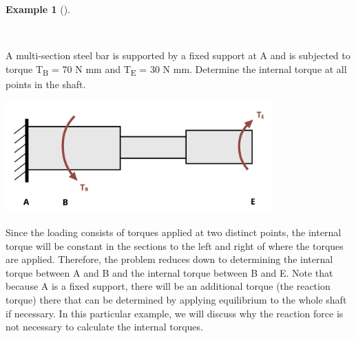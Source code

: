 \documentclass[
  letterpaper,
  DIV=11,
  numbers=noendperiod]{scrreprt}
\theoremstyle{definition}
\newtheorem{example}{Example}[chapter]
\theoremstyle{remark}
\begin{document}
\begin{tcolorbox}[enhanced jigsaw, leftrule=.75mm, bottomrule=.15mm, opacityback=0, opacitybacktitle=0.6, colframe=quarto-callout-tip-color-frame, toprule=.15mm, colbacktitle=quarto-callout-tip-color!10!white, coltitle=black, bottomtitle=1mm, title={Example 6.1}, titlerule=0mm, toptitle=1mm, colback=white, rightrule=.15mm, left=2mm, arc=.35mm, breakable]

\begin{example}[]\protect\hypertarget{exm-6.1}{}\label{exm-6.1}

~

A multi-section steel bar is supported by a fixed support at A and is
subjected to torque T\textsubscript{B} = 70 N mm and T\textsubscript{E}
= 30 N mm. Determine the internal torque at all points in the shaft.

\begin{center}
\includegraphics[width=4.04167in,height=\textheight]{images/CH6 PNGs/example 6.1 part 1.png}
\end{center}

\begin{tcolorbox}[enhanced jigsaw, leftrule=.75mm, bottomrule=.15mm, opacityback=0, opacitybacktitle=0.6, colframe=quarto-callout-tip-color-frame, toprule=.15mm, colbacktitle=quarto-callout-tip-color!10!white, coltitle=black, bottomtitle=1mm, title={Solution}, titlerule=0mm, toptitle=1mm, colback=white, rightrule=.15mm, left=2mm, arc=.35mm, breakable]

Since the loading consists of torques applied at two distinct points,
the internal torque will be constant in the sections to the left and
right of where the torques are applied. Therefore, the problem reduces
down to determining the internal torque between A and B and the internal
torque between B and E. Note that because A is a fixed support, there
will be an additional torque (the reaction torque) there that can be
determined by applying equilibrium to the whole shaft if necessary. In
this particular example, we will discuss why the reaction force is not
necessary to calculate the internal torques.~


\end{tcolorbox}
\end{example}
\end{tcolorbox}
\end{document}
